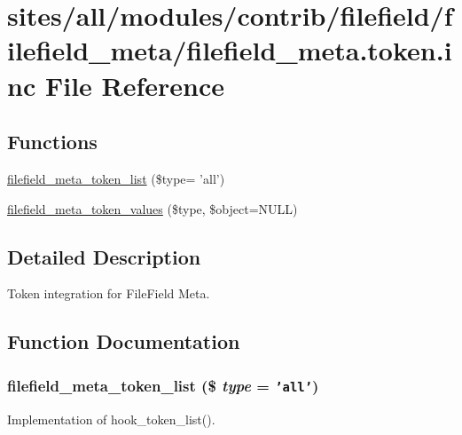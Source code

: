 \hypertarget{filefield__meta_8token_8inc}{
\section{sites/all/modules/contrib/filefield/filefield\_\-meta/filefield\_\-meta.token.inc File Reference}
\label{filefield__meta_8token_8inc}
}
\subsection*{Functions}
\begin{CompactItemize}
\item 
\hyperlink{filefield__meta_8token_8inc_8190552a4b803ac93cea704918254bd7}{filefield\_\-meta\_\-token\_\-list} (\$type= 'all')
\item 
\hyperlink{filefield__meta_8token_8inc_a70d09102d4a2e0dce10b81ae6e87296}{filefield\_\-meta\_\-token\_\-values} (\$type, \$object=NULL)
\end{CompactItemize}


\subsection{Detailed Description}
Token integration for FileField Meta. 

\subsection{Function Documentation}
\hypertarget{filefield__meta_8token_8inc_8190552a4b803ac93cea704918254bd7}{
\subsubsection[{filefield\_\-meta\_\-token\_\-list}]{\setlength{\rightskip}{0pt plus 5cm}filefield\_\-meta\_\-token\_\-list (\$ {\em type} = {\tt 'all'})}}
\label{filefield__meta_8token_8inc_8190552a4b803ac93cea704918254bd7}


Implementation of hook\_\-token\_\-list().


